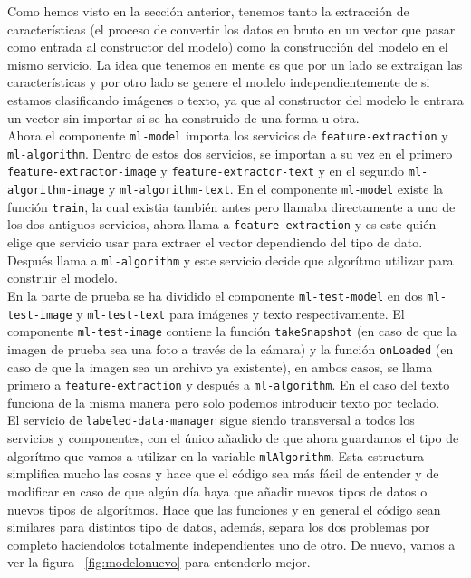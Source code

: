 \documentclass[a4paper, 12pt]{book}
\begin{document}
Como hemos visto en la sección anterior, tenemos tanto la extracción de características (el proceso de convertir los datos en bruto en un vector que pasar como entrada al constructor del modelo) como la construcción del modelo en el mismo servicio. La idea que tenemos en mente es que por un lado se extraigan las características y por otro lado se genere el modelo independientemente de si estamos clasificando imágenes o texto, ya que al constructor del modelo le entrara un vector sin importar si se ha construido de una forma u otra.\\
Ahora el componente \texttt{ml-model} importa los servicios de \texttt{feature-extraction} y \texttt{ml-algorithm}. Dentro de estos dos servicios, se importan a su vez en el primero \texttt{feature-extractor-image} y \texttt{feature-extractor-text} y en el segundo \texttt{ml-algorithm-image} y \texttt{ml-algorithm-text}.
En el componente \texttt{ml-model} existe la función \texttt{train}, la cual existia también antes pero llamaba directamente a uno de los dos antiguos servicios, ahora llama a \texttt{feature-extraction} y es este quién elige que servicio usar para extraer el vector dependiendo del tipo de dato. Después llama a \texttt{ml-algorithm} y este servicio decide que algorítmo utilizar para construir el modelo.\\
En la parte de prueba se ha dividido el componente \texttt{ml-test-model} en dos \texttt{ml-test-image} y \texttt{ml-test-text} para imágenes y texto respectivamente. El componente \texttt{ml-test-image} contiene la función \texttt{takeSnapshot} (en caso de que la imagen de prueba sea una foto a través de la cámara) y la función \texttt{onLoaded} (en caso de que la imagen sea un archivo ya existente), en ambos casos, se llama primero a \texttt{feature-extraction} y después a \texttt{ml-algorithm}. En el caso del texto funciona de la misma manera pero solo podemos introducir texto por teclado.\\
El servicio de \texttt{labeled-data-manager} sigue siendo transversal a todos los servicios y componentes, con el único añadido de que ahora guardamos el tipo de algorítmo que vamos a utilizar en la variable \texttt{mlAlgorithm}.
Esta estructura simplifica mucho las cosas y hace que el código sea más fácil de entender y de modificar en caso de que algún día haya que añadir nuevos tipos de datos o nuevos tipos de algorítmos. Hace que las funciones y en general el código sean similares para distintos tipo de datos, además, separa los dos problemas por completo haciendolos totalmente independientes uno de otro. De nuevo, vamos a ver la figura ~\ref{fig:modelonuevo} para entenderlo mejor.
\end{document}
